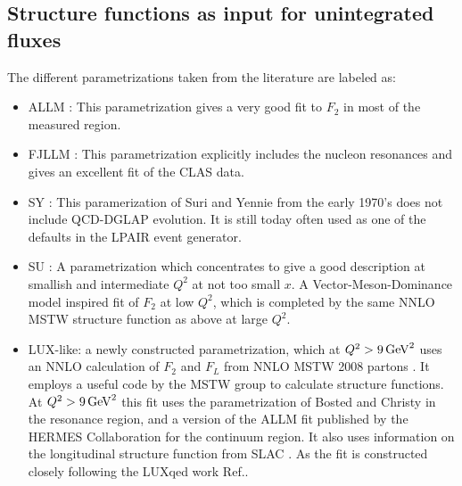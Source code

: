 \subsection{Structure functions as input for unintegrated fluxes}

The different parametrizations taken from the literature are labeled as:
\begin{itemize} 

 \item ALLM \cite{Abramowicz:1991xz,Abramowicz:1997ms}: This
   parametrization gives a very good fit to $F_2$ in most of the measured region.
   
\item FJLLM \cite{Fiore:2002re}: This parametrization explicitly
  includes the nucleon resonances and gives an excellent fit of the CLAS data.
  
\item SY \cite{Suri:1971yx}: This paramerization of Suri and Yennie
    from the early 1970's does not include QCD-DGLAP evolution. It is
    still today often used as one of the defaults in the LPAIR event generator.
    
\item SU \cite{Szczurek:1999rd}: A parametrization which concentrates
   to give a good description at smallish and intermediate $Q^2$ at not too small $x$.
   A Vector-Meson-Dominance model inspired fit of $F_2$ at low $Q^2$, which is completed by the same NNLO MSTW structure function as above at large $Q^2$.
   
\item LUX-like: a newly constructed parametrization, which at $Q^2 > 9 \, \rm{GeV}^2$ uses an NNLO calculation of $F_2$ and $F_L$ from NNLO MSTW 2008 partons \cite{Martin:2009iq}. 
It employs a useful code by the MSTW group \cite{Martin:2009iq} to calculate structure functions. At $Q^2 > 9 \, \rm{GeV}^2$ this fit uses the parametrization of Bosted and Christy \cite{Bosted:2007xd} in the resonance region, and a version of the ALLM fit published by the HERMES Collaboration \cite{Airapetian:2011nu} for the continuum
region. It also uses information on the longitudinal structure function from SLAC \cite{Abe:1998ym}. As the fit is constructed closely following
the LUXqed work Ref.\cite{Manohar:2017eqh}.
\end{itemize} 
	
